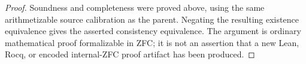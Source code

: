 \begin{proof}
Soundness and completeness were proved above, using the same
arithmetizable source calibration as the parent.  Negating the
resulting existence equivalence gives the asserted consistency
equivalence.  The argument is ordinary mathematical proof
formalizable in ZFC; it is not an assertion that a new Lean, Rocq,
or encoded internal-ZFC proof artifact has been produced.
\end{proof}
